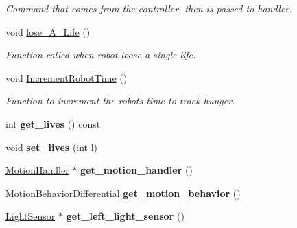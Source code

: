 \begin{DoxyCompactItemize}
\begin{DoxyCompactList}\small\item\em Command that comes from the controller, then is passed to handler. \end{DoxyCompactList}\item 
void \hyperlink{class_robot_ae0a3474ce96a7edee32f1b6597308d80}{lose\+\_\+\+A\+\_\+\+Life} ()\hypertarget{class_robot_ae0a3474ce96a7edee32f1b6597308d80}{}\label{class_robot_ae0a3474ce96a7edee32f1b6597308d80}

\begin{DoxyCompactList}\small\item\em Function called when robot loose a single life. \end{DoxyCompactList}\item 
void \hyperlink{class_robot_ad71cb8a7785ec61e938b62d1eb85c70e}{Increment\+Robot\+Time} ()\hypertarget{class_robot_ad71cb8a7785ec61e938b62d1eb85c70e}{}\label{class_robot_ad71cb8a7785ec61e938b62d1eb85c70e}

\begin{DoxyCompactList}\small\item\em Function to increment the robots time to track hunger. \end{DoxyCompactList}\item 
int {\bfseries get\+\_\+lives} () const \hypertarget{class_robot_a201302eeb10756e9f9a54de414efef08}{}\label{class_robot_a201302eeb10756e9f9a54de414efef08}

\item 
void {\bfseries set\+\_\+lives} (int l)\hypertarget{class_robot_a8823c73b258afe8cf8ef276e8f2f9aab}{}\label{class_robot_a8823c73b258afe8cf8ef276e8f2f9aab}

\item 
\hyperlink{class_motion_handler}{Motion\+Handler} $\ast$ {\bfseries get\+\_\+motion\+\_\+handler} ()\hypertarget{class_robot_a80b6c7f15493d4b5c608d185b9a116ce}{}\label{class_robot_a80b6c7f15493d4b5c608d185b9a116ce}

\item 
\hyperlink{class_motion_behavior_differential}{Motion\+Behavior\+Differential} {\bfseries get\+\_\+motion\+\_\+behavior} ()\hypertarget{class_robot_ab45bf3c6fdafcd14cdbdb2a8e3f558b8}{}\label{class_robot_ab45bf3c6fdafcd14cdbdb2a8e3f558b8}

\item 
\hyperlink{class_light_sensor}{Light\+Sensor} $\ast$ {\bfseries get\+\_\+left\+\_\+light\+\_\+sensor} ()\hypertarget{class_robot_ac2e00bdd8bfac97d1bd89c86ee0fd727}{}\label{class_robot_ac2e00bdd8bfac97d1bd89c86ee0fd727}


\end{DoxyCompactItemize}
